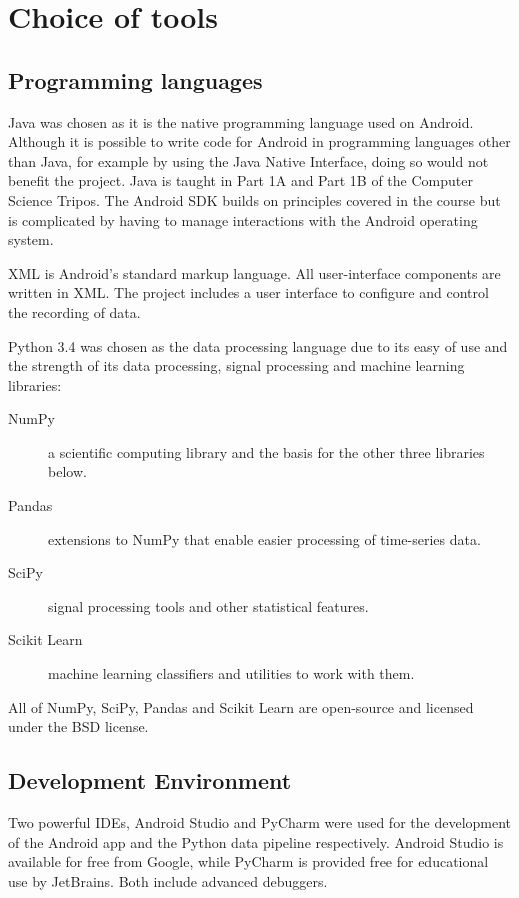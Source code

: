   \section{Choice of tools}
    \subsection{Programming languages}
      Java was chosen as it is the native programming language used on Android. Although it is
      possible to write code for Android in programming languages other than Java, for example 
      by using the Java Native Interface, doing so would not benefit the project. Java is taught in
      Part 1A and Part 1B of the Computer Science Tripos. The Android SDK builds on principles
      covered in the course but is complicated by having to manage interactions with the Android operating system.
      
      XML is Android's standard markup language. All user-interface components are written in XML.
      The project includes a user interface to configure and control the recording of data.
      
      Python 3.4 was chosen as the data processing language due to its easy of use and the strength of its data processing, signal processing and machine learning libraries:
      \begin{description}
        \item[NumPy] a scientific computing library and the basis for the other three libraries below.
        \item[Pandas] extensions to NumPy that enable easier processing of time-series data.
        \item[SciPy] signal processing tools and other statistical features.
        \item[Scikit Learn] machine learning classifiers and utilities to work with them.
      \end{description}
      All of NumPy, SciPy, Pandas and Scikit Learn are open-source and licensed under the BSD license.
    \subsection{Development Environment}
      Two powerful IDEs, Android Studio and PyCharm were used for the development of the Android app and the Python data pipeline respectively. Android Studio is available for free from Google, while PyCharm is provided free for educational use by JetBrains. Both include advanced debuggers.
      
